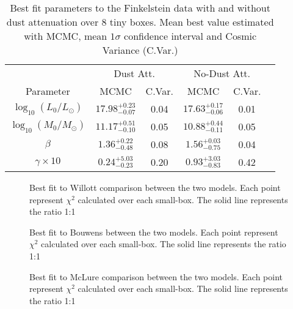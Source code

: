 \documentclass{emulateapj}
\begin{document}
\begin{table}
\begin{center}
\begin{tabular}{cccccc}\hline\hline
 & \multicolumn{2}{c}{Dust Att.} & \multicolumn{2}{c}{No-Dust Att.}\\
Parameter                  & MCMC                  & C.Var. & MCMC                    & C.Var. \\\hline
$\log_{10}(L_0/L_{\odot})$ & $17.98_{-0.07}^{+0.23}$ & 0.04 & $17.63_{-0.06}^{+0.17}$ & 0.01  \\
$\log_{10}(M_0/M_{\odot})$ & $11.17_{-0.10}^{+0.51}$ & 0.05 & $10.88_{-0.11}^{+0.44}$ & 0.05  \\
$\beta$                    & $ 1.36_{-0.48}^{+0.22}$ & 0.08 & $ 1.56_{-0.75}^{+0.03}$ & 0.04  \\
$\gamma\times10$           & $ 0.24_{-0.23}^{+5.03}$ & 0.20 & $ 0.93_{-0.83}^{+3.03}$ & 0.42  \\
\hline\hline
\end{tabular}
\caption{ Best fit parameters to the Finkelstein data with and without 
dust attenuation over 8 tiny boxes. Mean best value estimated 
with MCMC, mean $1\sigma$ confidence interval and Cosmic Variance
(C.Var.)
} 
\label{table:Finkelstein_best_fit_parameters_no_dust}
\end{center}
\end{table}



\begin{figure}
\caption{Best fit to Willott comparison between the two models. Each point represent $\chi^2$ 
calculated over each small-box. The solid line represents the ratio 1:1 }
\label{fig:OD1_chi2_comparison}
\end{figure}


\begin{figure}
\caption{Best fit to Bouwens between the two models. Each point represent $\chi^2$ 
calculated over each small-box. The solid line represents the ratio 1:1 }
\label{fig:OD2_chi2_comparison}
\end{figure}

\begin{figure}
\caption{Best fit to McLure comparison between the two models. Each point represent $\chi^2$ 
calculated over each small-box. The solid line represents the ratio 1:1 }
\label{fig:OD3_chi2_comparison}
\end{figure}
\end{document}
